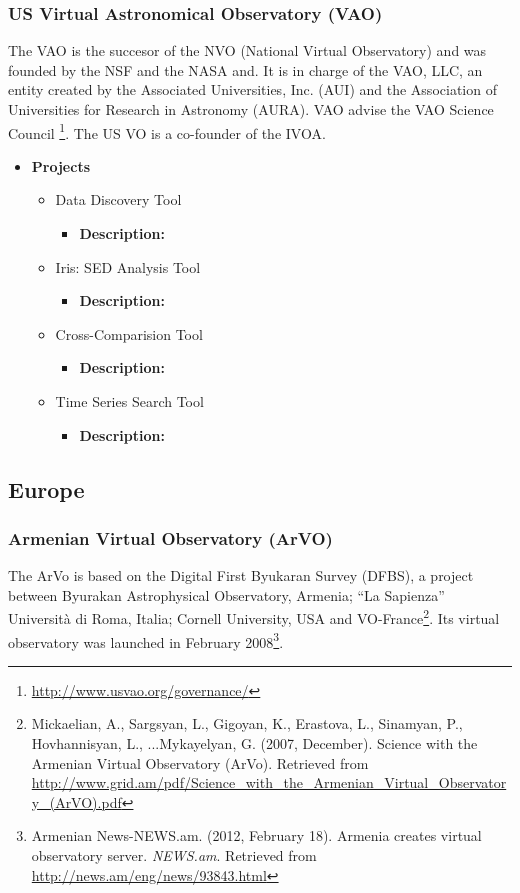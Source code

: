 \subsubsection{US Virtual Astronomical Observatory (VAO)}
The VAO is the succesor of the NVO (National Virtual Observatory) and was
founded by the NSF and the NASA and. It is in charge of the VAO, LLC, an entity
created by the Associated Universities, Inc. (AUI) and the Association of
Universities for Research in Astronomy (AURA). VAO advise the VAO Science
Council \footnote{\url{http://www.usvao.org/governance/}}. The US VO is a
co-founder of the IVOA.

\begin{itemize}
\item \textbf{Projects}
\begin{itemize}
\item Data Discovery Tool
\begin{itemize}
\item \textbf{Description:}
\end{itemize}
\item Iris: SED Analysis Tool
\begin{itemize}
\item \textbf{Description:}
\end{itemize}
\item Cross-Comparision Tool
\begin{itemize}
\item \textbf{Description:}
\end{itemize}
\item Time Series Search Tool
\begin{itemize}
\item \textbf{Description:}
\end{itemize}
\end{itemize}
\end{itemize}

\subsection{Europe}
\subsubsection{Armenian Virtual Observatory (ArVO)}
The ArVo is based on the Digital First Byukaran Survey (DFBS), a project between
Byurakan Astrophysical Observatory, Armenia; ``La Sapienza'' Universit\`{a} di
Roma, Italia; Cornell University, USA and VO-France\footnote{Mickaelian, A.,
Sargsyan, L., Gigoyan, K., Erastova, L., Sinamyan, P., Hovhannisyan, L.,
...Mykayelyan, G. (2007, December). Science with the Armenian Virtual
Observatory (ArVo).  Retrieved from
\url{http://www.grid.am/pdf/Science_with_the_Armenian_Virtual_Observatory_(ArVO).pdf}}.
Its virtual observatory was launched in February 2008\footnote{Armenian
News-NEWS.am. (2012, February 18). Armenia creates virtual observatory server.
\textit{NEWS.am}. Retrieved from \url{http://news.am/eng/news/93843.html}}.

